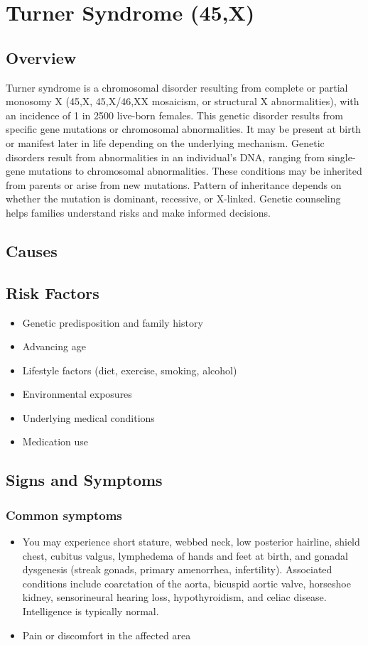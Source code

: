 \chapter{Turner Syndrome (45,X)}
\label{sec:Turner Syndrome}

\section{Overview}
Turner syndrome is a chromosomal disorder resulting from complete or partial monosomy X (45,X, 45,X/46,XX mosaicism, or structural X abnormalities), with an incidence of 1 in 2500 live-born females. This genetic disorder results from specific gene mutations or chromosomal abnormalities. It may be present at birth or manifest later in life depending on the underlying mechanism. Genetic disorders result from abnormalities in an individual's DNA, ranging from single-gene mutations to chromosomal abnormalities. These conditions may be inherited from parents or arise from new mutations. Pattern of inheritance depends on whether the mutation is dominant, recessive, or X-linked. Genetic counseling helps families understand risks and make informed decisions.
\section{Causes}
\section{Risk Factors}

\begin{itemize}[noitemsep]
  \item Genetic predisposition and family history
  \item Advancing age
  \item Lifestyle factors (diet, exercise, smoking, alcohol)
  \item Environmental exposures
  \item Underlying medical conditions
  \item Medication use
\end{itemize}
\section{Signs and Symptoms}

\subsection{Common symptoms}
\begin{itemize}[noitemsep]
  \item You may experience short stature, webbed neck, low posterior hairline, shield chest, cubitus valgus, lymphedema of hands and feet at birth, and gonadal dysgenesis (streak gonads, primary amenorrhea, infertility). Associated conditions include coarctation of the aorta, bicuspid aortic valve, horseshoe kidney, sensorineural hearing loss, hypothyroidism, and celiac disease. Intelligence is typically normal.

  \item Pain or discomfort in the affected area
  \end{itemize}


